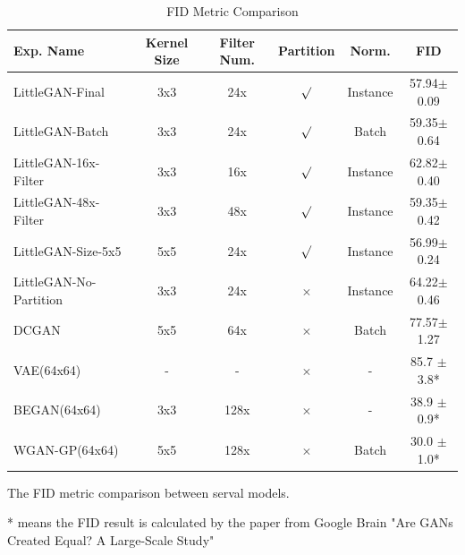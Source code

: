 \begin{table}
    \centering
    \caption{FID Metric Comparison}
    \label{result_fid}
    \begin{threeparttable}
    \begin{tabular}{l|ccccc}
        \hline
        Exp. Name    & Kernel Size & Filter Num.   & Partition          & Norm.         & FID            \\ \hline
        LittleGAN-Final        & 3x3         & 24x           & $\surd$            & Instance      & 57.94$\pm$0.09 \\
        LittleGAN-Batch       & 3x3         & 24x           & $\surd$            & Batch         & 59.35$\pm$0.64 \\
        LittleGAN-16x-Filter   & 3x3         & 16x           & $\surd$            & Instance      & 62.82$\pm$0.40 \\
        LittleGAN-48x-Filter  & 3x3         & 48x           & $\surd$            & Instance      & 59.35$\pm$0.42 \\
        LittleGAN-Size-5x5     & 5x5         & 24x           & $\surd$            & Instance      & 56.99$\pm$0.24 \\
        LittleGAN-No-Partition & 3x3         & 24x           & $\times$           & Instance      & 64.22$\pm$0.46 \\ \hline
        DCGAN        & 5x5         & 64x           & $\times$           & Batch         & 77.57$\pm$1.27 \\ \hline
        VAE(64x64)   & -           & -             & $\times$           & -             & 85.7 $\pm$3.8*  \\
        BEGAN(64x64) & 3x3         & 128x          & $\times$           & -             & 38.9 $\pm$0.9*  \\
        WGAN-GP(64x64) & 5x5       & 128x          & $\times$           & Batch         & 30.0 $\pm$1.0*  \\ \hline
    \end{tabular}
    \begin{tablenotes}
        \item The FID metric comparison between serval models.
        \item[*] means the FID result is calculated by the paper from Google Brain "Are GANs Created Equal? A Large-Scale Study"
    \end{tablenotes}
\end{threeparttable}
\end{table}

